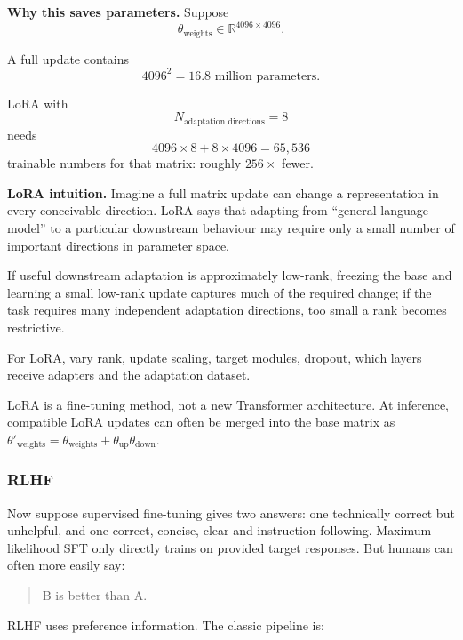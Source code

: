 \textbf{Why this saves parameters.}
Suppose
\[
\theta_{\text{weights}}
\in
\mathbb{R}^{4096\times4096}.
\]

A full update contains
\[
4096^2=16.8\text{ million parameters}.
\]

LoRA with
\[
N_{\text{adaptation directions}}=8
\]
needs
\[
4096\times8+8\times4096=65{,}536
\]
trainable numbers for that matrix: roughly $256\times$ fewer.

\textbf{LoRA intuition.}
Imagine a full matrix update can change a representation in every conceivable direction.
LoRA says that adapting from ``general language model'' to a particular downstream behaviour may require only a small number of important directions in parameter space.

\begin{calloutbias}
If useful downstream adaptation is approximately low-rank, freezing the base and learning a small low-rank update captures much of the required change; if the task requires many independent adaptation directions, too small a rank becomes restrictive.
\end{calloutbias}

\begin{calloutdegreeofexperiment}
For LoRA, vary rank, update scaling, target modules, dropout, which layers receive adapters and the adaptation dataset.
\end{calloutdegreeofexperiment}

\begin{calloutpractical}
LoRA is a fine-tuning method, not a new Transformer architecture.
At inference, compatible LoRA updates can often be merged into the base matrix as $\theta'_{\text{weights}}=\theta_{\text{weights}}+\theta_{\text{up}}\theta_{\text{down}}$.
\end{calloutpractical}

\subsubsection{RLHF}
\label{subsec:modern-rlhf}
Now suppose supervised fine-tuning gives two answers: one technically correct but unhelpful, and one correct, concise, clear and instruction-following.
Maximum-likelihood SFT only directly trains on provided target responses.
But humans can often more easily say:

\begin{quote}
B is better than A.
\end{quote}

RLHF uses preference information.
The classic pipeline is:

